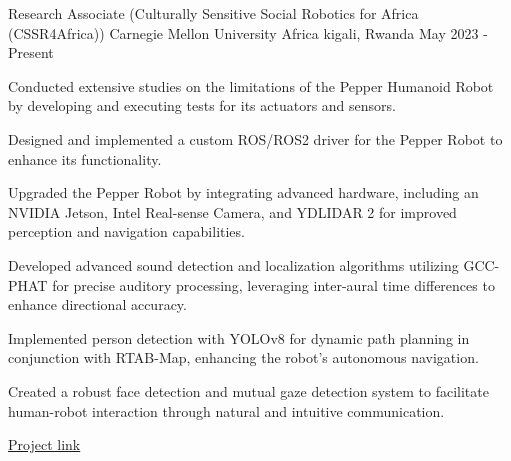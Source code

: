
\begin{cventries}

  \cvExperience
    {Research Associate (Culturally Sensitive Social Robotics for Africa (CSSR4Africa))} %
    {Carnegie Mellon University Africa} %
    {kigali, Rwanda} %
    {May 2023 - Present} %
    {
      \begin{cvitems} %
        \item {Conducted extensive studies on the limitations of the Pepper Humanoid Robot by developing and executing tests for its actuators and sensors.}
        \item {Designed and implemented a custom ROS/ROS2 driver for the Pepper Robot to enhance its functionality.}
        \item {Upgraded the Pepper Robot by integrating advanced hardware, including an NVIDIA Jetson, Intel Real-sense Camera, and YDLIDAR 2 for improved perception and navigation capabilities.}
        \item {Developed advanced sound detection and localization algorithms utilizing GCC-PHAT for precise auditory processing, leveraging inter-aural time differences to enhance directional accuracy.}
        \item {Implemented person detection with YOLOv8 for dynamic path planning in conjunction with RTAB-Map, enhancing the robot's autonomous navigation.}
        \item {Created a robust face detection and mutual gaze detection system to facilitate human-robot interaction through natural and intuitive communication.}
      \end{cvitems}
      }
      {\href{www.cssr4africa.org}{Project link}} %


\end{cventries}
